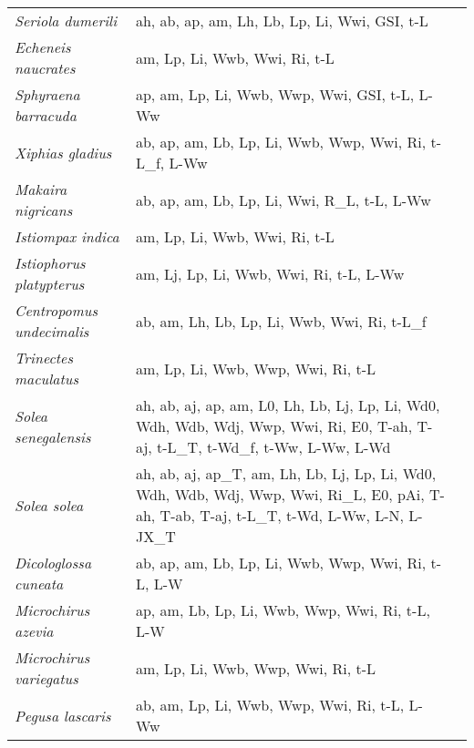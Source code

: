 {\begin{longtable}[c]{p{3.5cm}p{5.5cm}p{5.5cm}}
\emph{Seriola dumerili} &  ah, ab, ap, am, Lh, Lb, Lp, Li, Wwi, GSI, t-L & \citet{PapaMylo2005,Papa2013} \\
\emph{Echeneis naucrates} &  am, Lp, Li, Wwb, Wwi, Ri, t-L & \citet{BachKrau2018} \\
\emph{Sphyraena barracuda} &  ap, am, Lp, Li, Wwb, Wwp, Wwi, GSI, t-L, L-Ww & \citet{KadiAles2010} \\
\emph{Xiphias gladius} &  ab, ap, am, Lb, Lp, Li, Wwb, Wwp, Wwi, Ri, t-L\_f, L-Ww & \citet{WangSun2003,WangLin2010} \\
\emph{Makaira nigricans} &  ab, ap, am, Lb, Lp, Li, Wwi, R\_L, t-L, L-Ww & \citet{SponDeni2005,MartPinh2007,SunSu2013} \\
\emph{Istiompax indica} &  am, Lp, Li, Wwb, Wwi, Ri, t-L & \citet{SunYeh2015,SunChan2015} \\
\emph{Istiophorus platypterus} &  am, Lj, Lp, Li, Wwb, Wwi, Ri, t-L, L-Ww & \citet{Hool2006} \\
\emph{Centropomus undecimalis} &  ab, am, Lh, Lb, Lp, Li, Wwb, Wwi, Ri, t-L\_f & \citet{PereMend2013} \\
\emph{Trinectes maculatus} &  am, Lp, Li, Wwb, Wwp, Wwi, Ri, t-L &  \\
\emph{Solea senegalensis} &  ah, ab, aj, ap, am, L0, Lh, Lb, Lj, Lp, Li, Wd0, Wdh, Wdb, Wdj, Wwp, Wwi, Ri, E0, T-ah, T-aj, t-L\_T, t-Wd\_f, t-Ww, L-Ww, L-Wd & \citet{YufeParr1999,Vina2007,TeixCabr2010,DiniRibe1999,CarbFirm2018,RibeSara1999,RibeEngr2017,ParrYufe2001,CanaFern1999,MARE2019,OrtiFune2019} \\
\emph{Solea solea} &  ah, ab, aj, ap\_T, am, Lh, Lb, Lj, Lp, Li, Wd0, Wdh, Wdb, Wdj, Wwp, Wwi, Ri\_L, E0, pAi, T-ah, T-ab, T-aj, t-L\_T, t-Wd, L-Ww, L-N, L-JX\_T & \citet{Fond1979,Deni1981,MollKraa2007,Dore1986, Deni1981,Whee1978,DevaAlex1987,Day1996,GaloLaga1990,WittGree1995,Fond1989,Lund2008,Fonds1979,Teal2011,Deni1980,Fond1977} \\
\emph{Dicologlossa cuneata} &  ab, ap, am, Lb, Lp, Li, Wwb, Wwp, Wwi, Ri, t-L, L-W & \citet{MariIsma2007,BoufZero2018,BoufSaid2015,Ouab1991} \\
\emph{Microchirus azevia} &  ap, am, Lb, Lp, Li, Wwb, Wwp, Wwi, Ri, t-L, L-W & \citet{BoufZero2018,Mari1991} \\
\emph{Microchirus variegatus} &  am, Lp, Li, Wwb, Wwp, Wwi, Ri, t-L & \citet{Deni1990,GibsEzzi1980} \\
\emph{Pegusa lascaris} &  ab, am, Lp, Li, Wwb, Wwp, Wwi, Ri, t-L, L-Ww & \citet{Ahls1984,BoufMera2021,Deni1990,Mari1991} \\

\end{longtable}}
